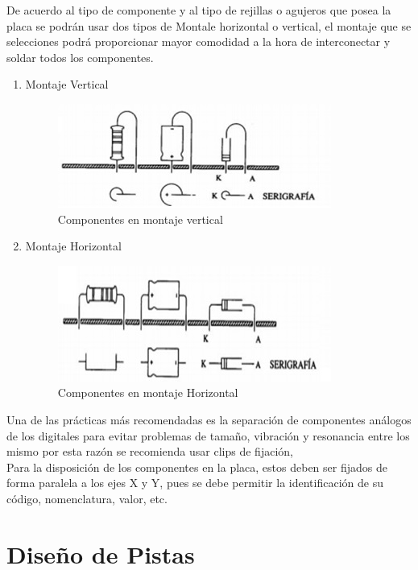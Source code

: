 \documentclass[a4paper,12pt,twoside]{proyectotanquesecci}
\begin{document}
De acuerdo al tipo de componente  y al tipo de rejillas o agujeros que posea la placa se podrán usar dos tipos de Montale horizontal o vertical, el montaje que se selecciones podrá proporcionar mayor comodidad a la hora de  interconectar y soldar todos los componentes.

\begin{enumerate}
\item	Montaje Vertical
\begin{figure}[h]
  \centering
  \includegraphics[scale=1.0]{MVERTICAL.jpg}
  \renewcommand{\figurename}{Fig.}
  \caption{Componentes en montaje vertical}
  \label{Componentes en montaje vertical}
  \end{figure}
\item	Montaje Horizontal
\begin{figure}[h]
  \centering
  \includegraphics[scale=1.0]{MHORIZONTAL.jpg}
  \renewcommand{\figurename}{Fig.}
  \caption{Componentes en montaje Horizontal}
  \label{Componentes en montaje Horizontal}
  \end{figure}
\end{enumerate}

Una de las prácticas más recomendadas es la separación de componentes análogos de los digitales para evitar problemas  de tamaño, vibración  y resonancia entre los mismo por esta razón se recomienda usar clips de fijación,\\

Para la disposición de los componentes en la placa, estos deben ser fijados  de forma paralela a los ejes X y Y,  pues se debe permitir la identificación  de su código, nomenclatura, valor, etc. \\

\section{Diseño de Pistas}
\end{document}
